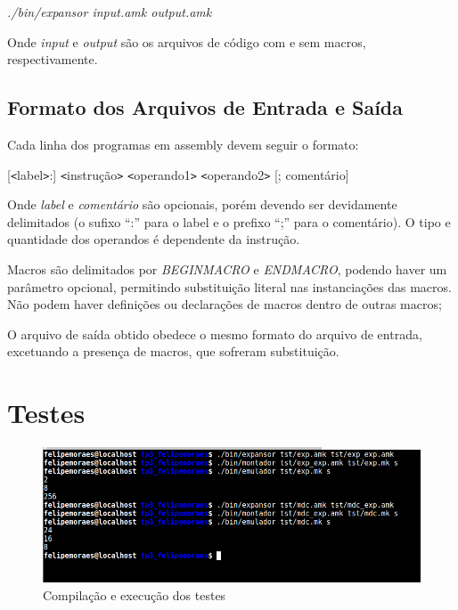 \documentclass[12pt, a4paper]{article}
\begin{document}
\begin{center}
\emph{./bin/expansor input.amk output.amk}
\end{center}

Onde \emph{input} e \emph{output} são os arquivos de código com e sem macros, respectivamente.

\subsection{Formato dos Arquivos de Entrada e Saída}

Cada linha dos programas em assembly devem seguir o formato:

\begin{center}
[{\tt<}label{\tt>}:] {\tt<}instrução{\tt>} {\tt<}operando1{\tt>} {\tt<}operando2{\tt>} [; comentário]
\end{center}

Onde \emph{label} e \emph{comentário} são opcionais, porém devendo ser devidamente delimitados (o sufixo ``:'' para o label e o prefixo ``;'' para o comentário). O tipo e quantidade dos operandos é dependente da instrução.

Macros são delimitados por \emph{BEGINMACRO} e \emph{ENDMACRO}, podendo haver um parâmetro opcional, permitindo substituição literal nas instanciações das macros. Não podem haver definições ou declarações de macros dentro de outras macros;

O arquivo de saída obtido obedece o mesmo formato do arquivo de entrada, excetuando a presença de macros, que sofreram substituição.

\section{Testes}

\begin{figure}
\centering
\includegraphics[width=1.0\textwidth]{RuntimeScreencap.png}
\caption{Compilação e execução dos testes}
\label{FigureExecution}
\end{figure}
\end{document}
